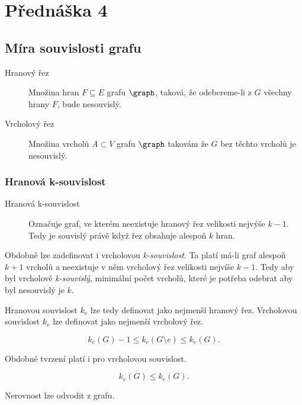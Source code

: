 \section{Přednáška 4}

\subsection{Míra souvislosti grafu}

\begin{description}
    \item[Hranový řez] Množina hran $F \subseteq E$ grafu $\graph$, taková, že odebereme-li z $G$ všechny hrany $F$, bude nesouvislý.
    \item[Vrcholový řez] Množina vrcholů $A \subset V$ grafu $\graph$ takovám že $G$ bez těchto vrcholů je nesouvislý.
\end{description}

\subsubsection{Hranová k-souvislost}

\begin{description}
    \item[Hranová k-souvislost] Označuje graf, ve kterém neexistuje hranový řez velikosti nejvýše $k-1$.
    Tedy je souvislý právě když řez obsahuje alespoň $k$ hran.
\end{description}

Obdobně lze zadefinovat i vrcholovou \textit{k-souvislost}.
Ta platí má-li graf alespoň $k+1$ vrcholů a neexistuje v něm vrcholový řez velikosti nejvíše $k-1$.
Tedy aby byl vrcholově \textit{k-souvislý}, minimální počet vrcholů, které je potřeba odebrat aby byl nesouvislý je $k$.

\medskip

Hranovou souvislost $k_e$ lze tedy definovat jako nejmenší hranový řez.
Vrcholovou souvislost $k_v$ lze definovat jako nejmenší vrcholový řez.


\[
    k_e(G) - 1 \leq k_e(G \setminus e) \leq k_e(G) \text{.}
\]

Obdobné tvrzení platí i pro vrcholovou souvislost.


\[
    k_v(G) \leq k_e(G) \text{.}
\]

Nerovnost lze odvodit z  grafu.

